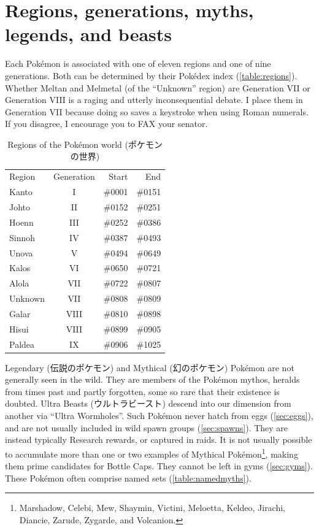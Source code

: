 \section{Regions, generations, myths, legends, and beasts\label{sec:regions}}
Each Pokémon is associated with one of eleven regions and one of nine generations.
Both can be determined by their Pokédex index (\autoref{table:regions}).
Whether Meltan and Melmetal (of the ``Unknown'' region) are Generation VII
  or Generation VIII is a raging and utterly inconsequential debate.
I place them in Generation VII because doing so saves a keystroke when using Roman numerals.
If you disagree, I encourage you to FAX your senator.
\begin{table}
\centering
\begin{tabular}{lcrr}
  Region & Generation & Start & End\\
  \Midrule
  Kanto & I & \#0001 & \#0151\\
  Johto & II & \#0152 & \#0251\\
  Hoenn & III & \#0252 & \#0386\\
  Sinnoh & IV & \#0387 & \#0493\\
  Unova & V & \#0494 & \#0649\\
  Kalos & VI & \#0650 & \#0721\\
  Alola & VII & \#0722 & \#0807\\
  Unknown & VII & \#0808 & \#0809\\
  Galar & VIII & \#0810 & \#0898\\
  Hisui & VIII & \#0899 & \#0905\\
  Paldea & IX & \#0906 & \#1025\\
\end{tabular}
\caption[Regions of the Pokémon world]{Regions of the Pokémon world (\textjapanese{ポケモンの世界})\label{table:regions}}
\end{table}
Legendary (\textjapanese{伝説のポケモン}) and Mythical (\textjapanese{幻のポケモン}) Pokémon
 are not generally seen in the wild.
They are members of the Pokémon mythos, heralds from times past and partly forgotten,
  some so rare that their existence is doubted.
Ultra Beasts (\textjapanese{ウルトラビースト}) descend into our dimension from
  another via ``Ultra Wormholes''.
Such Pokémon never hatch from eggs (\autoref{sec:eggs}), and are not usually included in wild spawn groups (\autoref{sec:spawns}).
They are instead typically Research rewards, or captured in raids.
It is not usually possible to accumulate more than one or two examples of Mythical
  Pokémon\footnote{Marshadow, Celebi, Mew, Shaymin, Victini, Meloetta, Keldeo,
  Jirachi, Diancie, Zarude, Zygarde, and Volcanion.}, making them prime
  candidates for Bottle Caps.
They cannot be left in gyms (\autoref{sec:gyms}).
These Pokémon often comprise named sets (\autoref{table:namedmyths}).


